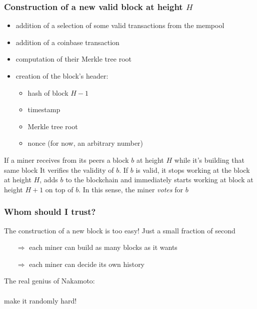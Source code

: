\documentclass[11pt]{beamer}  %
\begin{document}
\begin{frame}\frametitle{Construction of a new valid block at height $H$}

    \begin{greenbox}{}
      \begin{itemize}
      \item addition of a selection of some valid transactions from the mempool
      \item addition of a coinbase transaction
      \item computation of their Merkle tree root
      \item creation of the block's header:
        \begin{itemize}
        \item hash of block $H-1$
        \item timestamp
        \item Merkle tree root
        \item nonce (for now, an arbitrary number)
        \end{itemize}
      \end{itemize}
    \end{greenbox}

    \bigskip

    \begin{greenbox}{If a miner receives from its peers a block $b$ at height $H$
        while it's building that same block}
      It verifies the validity of $b$. If $b$ is valid,
      it stops working at the block at height $H$, adds $b$ to the blockchain
      and immediately starts working at block at height $H+1$ on top of $b$. In this sense,
      the miner \emph{votes} for $b$
    \end{greenbox}

\end{frame}

\begin{frame}\frametitle{Whom should I trust?}

  \begin{redbox}{The construction of a new block is too easy!}
    Just a small fraction of second

    \begin{itemize}
    \item[$\Rightarrow$] each miner can build as many blocks as it wants
    \item[$\Rightarrow$] each miner can decide its own history
    \end{itemize}
  \end{redbox}

  \bigskip
  \bigskip

  \pause

  \begin{center}
    The real genius of Nakamoto:\\

    \mbox{}\\
    
    {\Huge make it randomly hard!}
  \end{center}

\end{frame}
\end{document}
